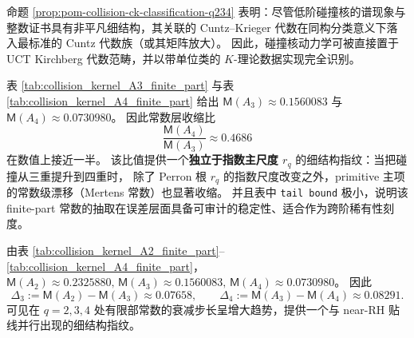 \begin{remark}[算子代数分类中的标准化塌缩]\label{rem:pom-collision-ck-standardization}
命题 \ref{prop:pom-collision-ck-classification-q234} 表明：尽管低阶碰撞核的谱现象与整数证书具有非平凡细结构，其关联的 Cuntz--Krieger 代数在同构分类意义下落入最标准的 Cuntz 代数族（或其矩阵放大）。
因此，碰撞核动力学可被直接置于 UCT Kirchberg 代数范畴，并以带单位类的 \(K\)-理论数据实现完全识别。
\end{remark}



\begin{remark}\label{rem:pom-collision-mertens-halving}
表 \ref{tab:collision_kernel_A3_finite_part} 与表 \ref{tab:collision_kernel_A4_finite_part} 给出
\(
\mathsf{M}(A_3)\approx 0.1560083
\)
与
\(
\mathsf{M}(A_4)\approx 0.0730980
\)。
因此常数层收缩比
\[
\boxed{\;
\frac{\mathsf{M}(A_4)}{\mathsf{M}(A_3)}\approx 0.4686\;}
\]
 在数值上接近一半。
该比值提供一个\textbf{独立于指数主尺度 \(r_q\)} 的细结构指纹：当把碰撞从三重提升到四重时，
除了 Perron 根 \(r_q\) 的指数尺度改变之外，primitive 主项的常数级漂移（Mertens 常数）也显著收缩。
并且表中 \texttt{tail bound} 极小，说明该 finite-part 常数的抽取在误差层面具备可审计的稳定性、适合作为跨阶稀有性刻度。
\end{remark}

\begin{remark}[有限部常数的步长加速（\(A_2\to A_4\)）]\label{rem:pom-collision-mertens-accel}
由表 \ref{tab:collision_kernel_A2_finite_part}--\ref{tab:collision_kernel_A4_finite_part}，
\(
\mathsf{M}(A_2)\approx 0.2325880,\,
\mathsf{M}(A_3)\approx 0.1560083,\,
\mathsf{M}(A_4)\approx 0.0730980
\)。
因此
\[
\Delta_3:=\mathsf{M}(A_2)-\mathsf{M}(A_3)\approx 0.07658,\qquad
\Delta_4:=\mathsf{M}(A_3)-\mathsf{M}(A_4)\approx 0.08291.
\]
可见在 \(q=2,3,4\) 处有限部常数的衰减步长呈增大趋势，提供一个与 near-RH 贴线并行出现的细结构指纹。
\end{remark}
